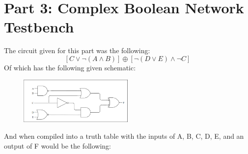 \section{Part 3: Complex Boolean Network Testbench}
The circuit given for this part was the following:
$$ [C \lor \neg(A \land B)] \oplus [\neg(D \lor E) \land \neg C] $$
Of which has the following given schematic:
\begin{figure}[!htbp]
    \centering
    \caption{}
    \includegraphics[width=0.5\textwidth]{part-3-schem.png}
    \label{Figure 1}
\end{figure}\newpage
And when compiled into a truth table with the inputs of A, B, C, D, E, and an output of F would be the following:
